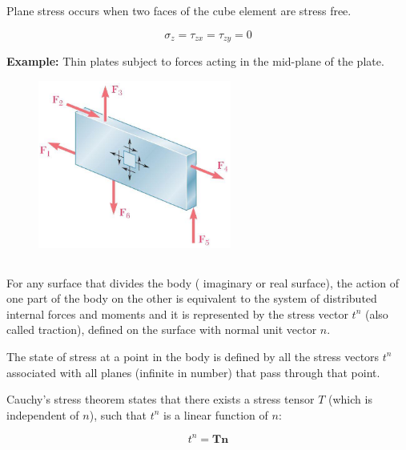 \noindent Plane stress occurs when two faces of the cube element are stress free.

\[\sigma_{z}=\tau_{zx}=\tau_{zy}=0\]

\noindent \textbf{Example:} Thin plates subject to forces acting in the mid-plane of the plate.

\begin{figure}[!h]
\centering
\includegraphics[angle=0, width=2.5in]{Stress Transformation-Figures/Thin Plate.png}
\vspace{-2mm}
\caption{\small {}}
\vspace{-3mm}
\label{Fig:ThinPlate}
\end{figure}

\subsection{}

For any surface that divides the body ( imaginary or real surface), the action of one part of the body on the other is equivalent to the system of distributed internal forces and moments and it is represented by the stress vector $t^n$ (also called traction), defined on the surface with normal unit vector $n$.

\vspace{5pt}

\noindent The state of stress at a point in the body is defined by all the stress vectors $t^n$ associated with all planes (infinite in number) that pass through that point.

\vspace{5pt}

\noindent Cauchy’s stress theorem states that there exists a stress tensor $T$ (which is independent of $n$), such that $t^n$
 is a linear function of $n$:

\[t^n=\boldsymbol{T}\boldsymbol{n}\]

